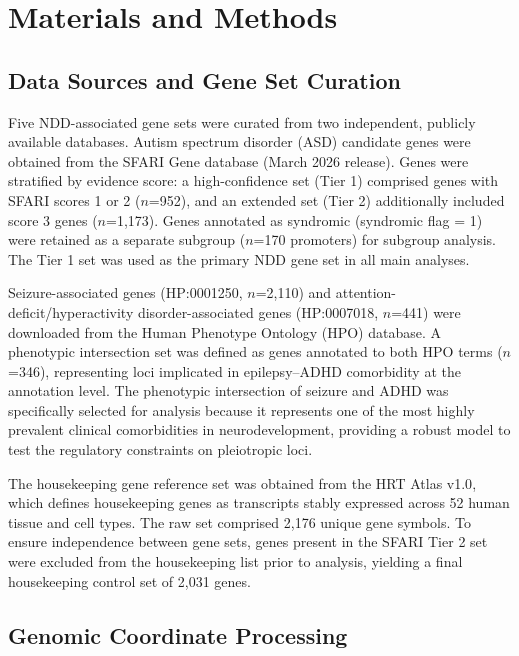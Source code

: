 \documentclass[11pt, a4paper]{article}
\begin{document}
\section*{Materials and Methods}

\subsection*{Data Sources and Gene Set Curation}

Five NDD-associated gene sets were curated from two independent,
publicly available databases.
Autism spectrum disorder (ASD) candidate genes were obtained
from the SFARI Gene database (March 2026 release)\cite{sfari}.
Genes were stratified by evidence score: a high-confidence set
(Tier 1) comprised genes with SFARI scores 1 or 2 ($n$=952),
and an extended set (Tier 2) additionally included score 3 genes
($n$=1,173). Genes annotated as syndromic (syndromic flag = 1)
were retained as a separate subgroup ($n$=170 promoters) for
subgroup analysis. The Tier 1 set was used as the primary NDD
gene set in all main analyses.

Seizure-associated genes (HP:0001250, $n$=2,110) and
attention-deficit/hyperactivity disorder-associated genes
(HP:0007018, $n$=441) were downloaded from the Human
Phenotype Ontology (HPO) database\cite{hpo}.
A phenotypic intersection set was defined as genes annotated to both HPO
terms ($n$=346), representing loci implicated in
epilepsy--ADHD comorbidity at the annotation level. 
The phenotypic intersection of seizure and ADHD was specifically selected for analysis because it represents one of the most highly prevalent clinical comorbidities in neurodevelopment, providing a robust model to test the regulatory constraints on pleiotropic loci\cite{fan2023}.

The housekeeping gene reference set was obtained from the
HRT Atlas v1.0\cite{hounkpe2021}, which defines housekeeping
genes as transcripts stably expressed across 52 human tissue
and cell types.
The raw set comprised 2,176 unique gene
symbols. To ensure independence between gene sets, genes
present in the SFARI Tier 2 set were excluded from the
housekeeping list prior to analysis, yielding a final
housekeeping control set of 2,031 genes.

\subsection*{Genomic Coordinate Processing}
\end{document}
